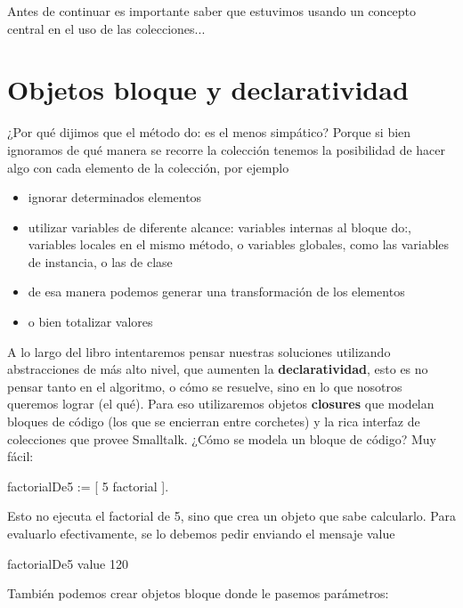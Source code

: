 \documentclass[a4paper,12pt]{book}
\begin{document}
Antes de continuar es importante saber que estuvimos usando un concepto central en el uso de las colecciones...
\\

\section{Objetos bloque y declaratividad}
¿Por qué dijimos que el método do: es el menos simpático? Porque si bien ignoramos de qué manera se recorre la
colección tenemos la posibilidad de hacer algo con cada elemento de la colección, por ejemplo
\begin{itemize}
 \item ignorar determinados elementos
 \item utilizar variables de diferente alcance: variables internas al bloque do:, variables locales en el mismo
 método, o variables globales, como las variables de instancia, o las de clase
 \item de esa manera podemos generar una transformación de los elementos
 \item o bien totalizar valores
\end{itemize}
A lo largo del libro intentaremos pensar nuestras soluciones utilizando abstracciones de más alto nivel, 
que aumenten la \textbf{declaratividad}, esto es no pensar tanto en el algoritmo, o cómo se resuelve, 
sino en lo que nosotros queremos lograr (el qué). Para eso utilizaremos objetos \textbf{closures} que
modelan bloques de código  (los que se encierran entre corchetes) y la rica interfaz de colecciones que
provee Smalltalk.
\newline
\newline
¿Cómo se modela un bloque de código? Muy fácil:

\begin{code}
factorialDe5 := [ 5 factorial ].
\end{code}

\vspace{\baselineskip}
Esto no ejecuta el factorial de 5, sino que crea un objeto que sabe calcularlo. Para evaluarlo efectivamente, 
se lo debemos pedir enviando el mensaje value

\begin{code}
factorialDe5 value
    120
\end{code}

\vspace{\baselineskip}
También podemos crear objetos bloque donde le pasemos parámetros:
\end{document}
